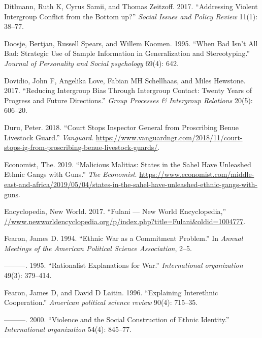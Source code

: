 \documentclass[11pt]{article}
\begin{document}
\leavevmode\hypertarget{ref-ditlmann2017addressing}{}%
Ditlmann, Ruth K, Cyrus Samii, and Thomas Zeitzoff. 2017. ``Addressing
Violent Intergroup Conflict from the Bottom up?'' \emph{Social Issues
and Policy Review} 11(1): 38--77.

\leavevmode\hypertarget{ref-doosje1995bad}{}%
Doosje, Bertjan, Russell Spears, and Willem Koomen. 1995. ``When Bad
Isn't All Bad: Strategic Use of Sample Information in Generalization and
Stereotyping.'' \emph{Journal of Personality and Social psychology}
69(4): 642.

\leavevmode\hypertarget{ref-dovidio2017reducing}{}%
Dovidio, John F, Angelika Love, Fabian MH Schellhaas, and Miles
Hewstone. 2017. ``Reducing Intergroup Bias Through Intergroup Contact:
Twenty Years of Progress and Future Directions.'' \emph{Group Processes
\& Intergroup Relations} 20(5): 606--20.

\leavevmode\hypertarget{ref-duru2018court}{}%
Duru, Peter. 2018. ``Court Stops Inspector General from Proscribing
Benue Livestock Guard.'' \emph{Vanguard}.
\url{https://www.vanguardngr.com/2018/11/court-stops-ig-from-proscribing-benue-livestock-guards/}.

\leavevmode\hypertarget{ref-economist2019militias}{}%
Economist, The. 2019. ``Malicious Malitias: States in the Sahel Have
Unleashed Ethnic Gangs with Guns.'' \emph{The Economist}.
\url{https://www.economist.com/middle-east-and-africa/2019/05/04/states-in-the-sahel-have-unleashed-ethnic-gangs-with-guns}.

\leavevmode\hypertarget{ref-fulanisize2017}{}%
Encyclopedia, New World. 2017. ``Fulani --- New World Encyclopedia,''
\url{//www.newworldencyclopedia.org/p/index.php?title=Fulani\&oldid=1004777}.

\leavevmode\hypertarget{ref-fearon1994ethnic}{}%
Fearon, James D. 1994. ``Ethnic War as a Commitment Problem.'' In
\emph{Annual Meetings of the American Political Science Association},
2--5.

\leavevmode\hypertarget{ref-fearon1995rationalist}{}%
---------. 1995. ``Rationalist Explanations for War.''
\emph{International organization} 49(3): 379--414.

\leavevmode\hypertarget{ref-fearon1996explaining}{}%
Fearon, James D, and David D Laitin. 1996. ``Explaining Interethnic
Cooperation.'' \emph{American political science review} 90(4): 715--35.

\leavevmode\hypertarget{ref-fearon2000violence}{}%
---------. 2000. ``Violence and the Social Construction of Ethnic
Identity.'' \emph{International organization} 54(4): 845--77.
\end{document}
